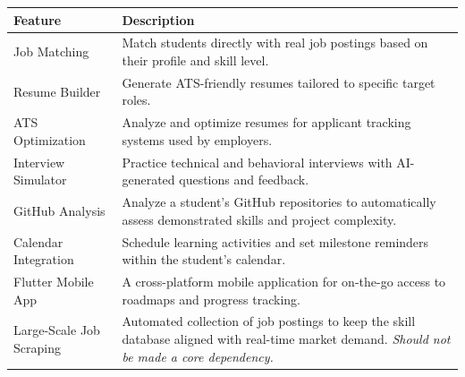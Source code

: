 \documentclass[12pt,a4paper]{article}
\begin{document}
\begin{center}
\renewcommand{\arraystretch}{1.3}
\begin{tabularx}{\textwidth}{@{} l X @{}}
\toprule
\textbf{Feature} & \textbf{Description} \\
\midrule
Job Matching &
  Match students directly with real job postings based on their profile and skill level. \\

Resume Builder &
  Generate ATS-friendly resumes tailored to specific target roles. \\

ATS Optimization &
  Analyze and optimize resumes for applicant tracking systems used by employers. \\

Interview Simulator &
  Practice technical and behavioral interviews with AI-generated questions and feedback. \\

GitHub Analysis &
  Analyze a student's GitHub repositories to automatically assess demonstrated skills and project complexity. \\

Calendar Integration &
  Schedule learning activities and set milestone reminders within the student's calendar. \\

Flutter Mobile App &
  A cross-platform mobile application for on-the-go access to roadmaps and progress tracking. \\

Large-Scale Job Scraping &
  Automated collection of job postings to keep the skill database aligned with real-time market demand. \textit{Should not be made a core dependency.} \\
\bottomrule
\end{tabularx}
\end{center}

\vspace{1cm}

\begin{center}
\end{center}
\end{document}
